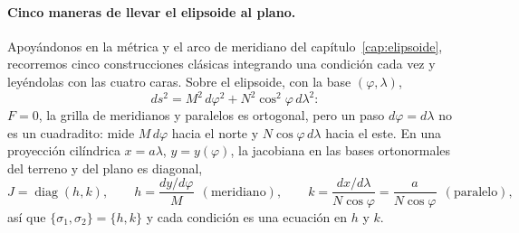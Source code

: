 \paragraph{Cinco maneras de llevar el elipsoide al plano.} Apoyándonos en la métrica y el arco de meridiano del capítulo~\ref{cap:elipsoide}, recorremos cinco construcciones clásicas
integrando una condición cada vez y leyéndolas con las cuatro caras. Sobre el
elipsoide, con la base \((\varphi,\lambda)\),
\[
  ds^2=M^2\,d\varphi^2+N^2\cos^2\varphi\,d\lambda^2 :
\]
\(F=0\), la grilla de meridianos y paralelos es ortogonal, pero un paso \(d\varphi=d\lambda\)
no es un cuadradito: mide \(M\,d\varphi\) hacia el norte y \(N\cos\varphi\,d\lambda\) hacia
el este. En una proyección cilíndrica \(x=a\lambda\), \(y=y(\varphi)\), la jacobiana en las
bases ortonormales del terreno y del plano es diagonal,
\[
  J=\operatorname{diag}(h,k),\qquad
  h=\frac{dy/d\varphi}{M}\ \ (\text{meridiano}),\qquad
  k=\frac{dx/d\lambda}{N\cos\varphi}=\frac{a}{N\cos\varphi}\ \ (\text{paralelo}),
\]
así que \(\{\sigma_1,\sigma_2\}=\{h,k\}\) y cada condición es una ecuación en \(h\) y \(k\).

